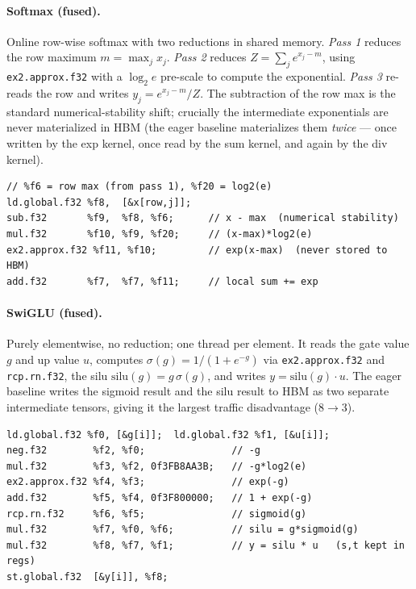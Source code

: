 \documentclass[11pt,a4paper]{article}
\begin{document}
\paragraph{Softmax (fused).} Online row-wise softmax with two reductions in
shared memory. \emph{Pass 1} reduces the row maximum $m=\max_j x_j$.
\emph{Pass 2} reduces $Z=\sum_j e^{x_j-m}$, using
\texttt{ex2.approx.f32} with a $\log_2 e$ pre-scale to compute the exponential.
\emph{Pass 3} re-reads the row and writes $y_j = e^{x_j-m}/Z$. The subtraction
of the row max is the standard numerical-stability shift; crucially the
intermediate exponentials are never materialized in HBM (the eager baseline
materializes them \emph{twice} --- once written by the exp kernel, once read by
the sum kernel, and again by the div kernel).

\begin{lstlisting}[caption={Fused softmax PTX (skeleton; pass-2 exp + accumulate).},captionpos=b]
// %f6 = row max (from pass 1), %f20 = log2(e)
ld.global.f32 %f8,  [&x[row,j]];
sub.f32       %f9,  %f8, %f6;      // x - max  (numerical stability)
mul.f32       %f10, %f9, %f20;     // (x-max)*log2(e)
ex2.approx.f32 %f11, %f10;         // exp(x-max)  (never stored to HBM)
add.f32       %f7,  %f7, %f11;     // local sum += exp
\end{lstlisting}

\paragraph{SwiGLU (fused).} Purely elementwise, no reduction; one thread per
element. It reads the gate value $g$ and up value $u$, computes
$\sigma(g) = 1/(1+e^{-g})$ via \texttt{ex2.approx.f32} and \texttt{rcp.rn.f32},
the silu $\mathrm{silu}(g) = g\,\sigma(g)$, and writes $y = \mathrm{silu}(g)\cdot u$.
The eager baseline writes the sigmoid result and the silu result to HBM as two
separate intermediate tensors, giving it the largest traffic disadvantage
($8\to3$).

\begin{lstlisting}[caption={Fused SwiGLU PTX (skeleton; full body).},captionpos=b]
ld.global.f32 %f0, [&g[i]];  ld.global.f32 %f1, [&u[i]];
neg.f32        %f2, %f0;               // -g
mul.f32        %f3, %f2, 0f3FB8AA3B;   // -g*log2(e)
ex2.approx.f32 %f4, %f3;               // exp(-g)
add.f32        %f5, %f4, 0f3F800000;   // 1 + exp(-g)
rcp.rn.f32     %f6, %f5;               // sigmoid(g)
mul.f32        %f7, %f0, %f6;          // silu = g*sigmoid(g)
mul.f32        %f8, %f7, %f1;          // y = silu * u   (s,t kept in regs)
st.global.f32  [&y[i]], %f8;
\end{lstlisting}
\end{document}

